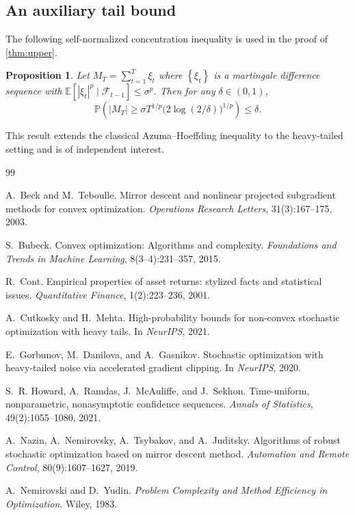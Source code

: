 \documentclass[11pt,a4paper]{article}
\theoremstyle{plain}
\newtheorem{proposition}[theorem]{Proposition}
\theoremstyle{definition}
\theoremstyle{remark}
\newcommand{\E}{\mathbb{E}}
\newcommand{\PP}{\mathbb{P}}
\newcommand{\abs}[1]{\left\lvert#1\right\rvert}
\newcommand{\set}[1]{\left\{#1\right\}}
\begin{document}
\subsection{An auxiliary tail bound}

The following self-normalized concentration inequality is used in the proof
of \cref{thm:upper}.

\begin{proposition}
\label{prop:selfnorm}
Let $M_T = \sum_{t=1}^T \xi_t$ where $\set{\xi_t}$ is a martingale difference
sequence with $\E[\abs{\xi_t}^p \mid \mathcal{F}_{t-1}] \leq \sigma^p$.
Then for any $\delta \in (0, 1)$,
\begin{equation*}
    \PP\!\left(
        \abs{M_T} \geq \sigma T^{1/p} \bigl(2 \log(2/\delta)\bigr)^{1/p}
    \right) \leq \delta.
\end{equation*}
\end{proposition}

This result extends the classical Azuma--Hoeffding inequality to the
heavy-tailed setting and is of independent interest.

\begin{thebibliography}{99}

A.~Beck and M.~Teboulle.
\newblock Mirror descent and nonlinear projected subgradient methods for
  convex optimization.
\newblock \emph{Operations Research Letters}, 31(3):167--175, 2003.

S.~Bubeck.
\newblock Convex optimization: Algorithms and complexity.
\newblock \emph{Foundations and Trends in Machine Learning},
  8(3--4):231--357, 2015.

R.~Cont.
\newblock Empirical properties of asset returns: stylized facts and
  statistical issues.
\newblock \emph{Quantitative Finance}, 1(2):223--236, 2001.

A.~Cutkosky and H.~Mehta.
\newblock High-probability bounds for non-convex stochastic optimization with
  heavy tails.
\newblock In \emph{NeurIPS}, 2021.

E.~Gorbunov, M.~Danilova, and A.~Gasnikov.
\newblock Stochastic optimization with heavy-tailed noise via accelerated
  gradient clipping.
\newblock In \emph{NeurIPS}, 2020.

S.~R. Howard, A.~Ramdas, J.~McAuliffe, and J.~Sekhon.
\newblock Time-uniform, nonparametric, nonasymptotic confidence sequences.
\newblock \emph{Annals of Statistics}, 49(2):1055--1080, 2021.

A.~Nazin, A.~Nemirovsky, A.~Tsybakov, and A.~Juditsky.
\newblock Algorithms of robust stochastic optimization based on mirror descent
  method.
\newblock \emph{Automation and Remote Control}, 80(9):1607--1627, 2019.

A.~Nemirovski and D.~Yudin.
\newblock \emph{Problem Complexity and Method Efficiency in Optimization}.
\newblock Wiley, 1983.

\end{thebibliography}
\end{document}
